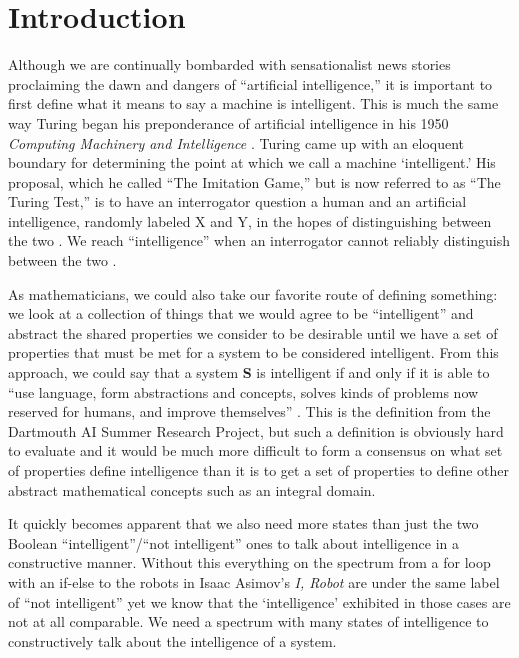 \documentclass[oneside,12pt,openany]{book}
\begin{document}
	\chapter{Introduction}
	
	Although we are continually bombarded with sensationalist news stories proclaiming the dawn and dangers of ``artificial intelligence,'' it is important to first define what it means to say a machine is intelligent. This is much the same way Turing began his preponderance of artificial intelligence in his 1950 \textit{Computing Machinery and Intelligence} \cite{Turing}. Turing came up with an eloquent boundary for determining the point at which we call a machine `intelligent.' His proposal, which he called ``The Imitation Game,'' but is now referred to as ``The Turing Test,'' is to have an interrogator question a human and an artificial intelligence, randomly labeled X and Y, in the hopes of distinguishing between the two \cite{Turing}. We reach ``intelligence'' when an interrogator cannot reliably distinguish between the two \cite{Turing}.
	
	As mathematicians, we could also take our favorite route of defining something: we look at a collection of things that we would agree to be ``intelligent'' and abstract the shared properties we consider to be desirable until we have a set of properties that must be met for a system to be considered intelligent. From this approach, we could say that a system \textbf{S} is intelligent if and only if it is able to ``use language, form abstractions and concepts, solves kinds of problems now reserved for humans, and improve themselves'' \cite{Jones}. This is the definition from the Dartmouth AI Summer Research Project, but such a definition is obviously hard to evaluate and it would be much more difficult to form a consensus on what set of properties define intelligence than it is to get a set of properties to define other abstract mathematical concepts such as an integral domain.
	
	It quickly becomes apparent that we also need more states than just the two Boolean ``intelligent''/``not intelligent'' ones to talk about intelligence in a constructive manner. Without this everything on the spectrum from a for loop with an if-else to the robots in Isaac Asimov's \textit{I, Robot}  are under the same label of ``not intelligent'' yet we know that the `intelligence' exhibited in those cases are not at all comparable. We need a spectrum with many states of intelligence to constructively talk about the intelligence of a system.
	
\end{document}

